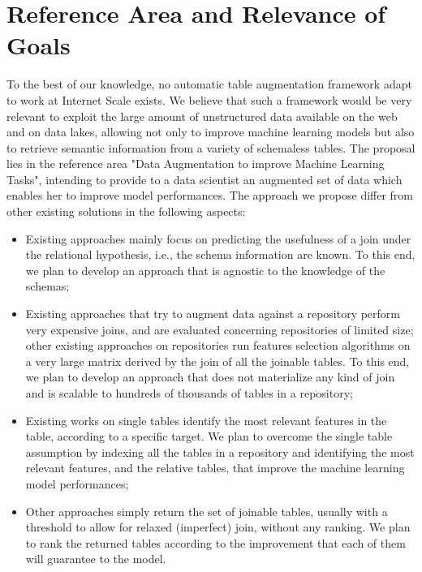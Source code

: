 \section{Reference Area and Relevance of Goals}\label{reference}
To the best of our knowledge, no automatic table augmentation framework adapt to work at Internet Scale exists. We believe that such a framework would be very relevant to exploit the large amount of unstructured data available on the web and on data lakes, allowing not only to improve machine learning models but also to retrieve semantic information from a variety of schemaless tables.
The proposal lies in the reference area "Data Augmentation to improve Machine Learning Tasks", intending to provide to a data scientist an augmented set of data which enables her to improve model performances. The approach we propose differ from other existing solutions in the following aspects:
\begin{itemize}
    \item Existing approaches mainly focus on predicting the usefulness of a join under the relational hypothesis, i.e., the schema information are known. To this end, we plan to develop an approach that is agnostic to the knowledge of the schemas;
    \item Existing approaches that try to augment data against a repository perform very expensive joins, and are evaluated concerning repositories of limited size; other existing approaches on repositories run features selection algorithms on a very large matrix derived by the join of all the joinable tables. To this end, we plan to develop an approach that does not materialize any kind of join and is scalable to hundreds of thousands of tables in a repository;
    \item Existing works on single tables identify the most relevant features in the table, according to a specific target. We plan to overcome the single table assumption by indexing all the tables in a repository and identifying the most relevant features, and the relative tables, that improve the machine learning model performances;
    \item Other approaches simply return the set of joinable tables, usually with a threshold to allow for relaxed  (imperfect) join, without any ranking. We plan to rank the returned tables according to the improvement that each of them will guarantee to the model.
\end{itemize}    